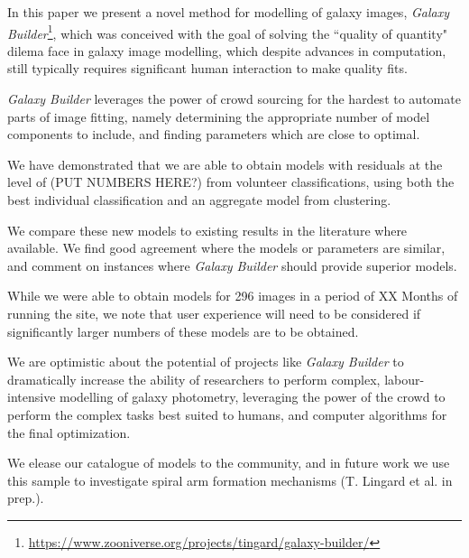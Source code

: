 \documentclass[../main.tex]{subfiles}
\begin{document}
\label{sec:conclusions}
In this paper we present a novel method for modelling of galaxy images, \textit{Galaxy Builder}\footnote{\url{https://www.zooniverse.org/projects/tingard/galaxy-builder/}}, which was conceived with the goal of solving the ``quality of quantity" dilema face in galaxy image modelling, which despite advances in computation, still typically requires significant human interaction to make quality fits. 

\textit{Galaxy Builder} leverages the power of crowd sourcing for the hardest to automate parts of image fitting, namely determining the appropriate number of model components to include, and finding parameters which are close to optimal.  


We have demonstrated that we are able to obtain models with residuals at the level of (PUT NUMBERS HERE?) from volunteer classifications, using both the best individual classification and an aggregate model from clustering. 

We compare these new models to existing results in the literature where available. We find good agreement where the models or parameters are similar, and comment on instances where \textit{Galaxy Builder} should provide superior models. 



While we were able to obtain models for 296 images in a period of XX Months of running the site, we note that user experience will need to be considered if significantly larger numbers of these models are to be obtained. 

We are optimistic about the potential of projects like \textit{Galaxy Builder} to dramatically increase the ability of researchers to perform complex, labour-intensive modelling of galaxy photometry, leveraging the power of the crowd to perform the complex tasks best suited to humans, and computer algorithms for the final optimization. 

We elease our catalogue of models to the community, and in future work we use this sample to investigate spiral arm formation mechanisms (T. Lingard et al. in prep.). 
\end{document}
